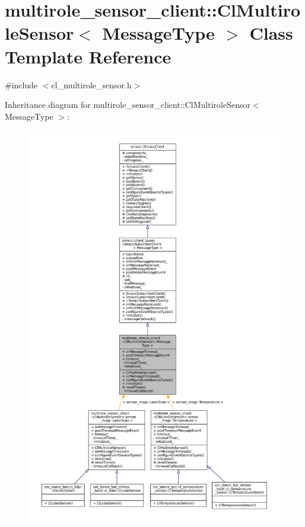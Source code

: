 \hypertarget{classmultirole__sensor__client_1_1ClMultiroleSensor}{}\section{multirole\+\_\+sensor\+\_\+client\+:\+:Cl\+Multirole\+Sensor$<$ Message\+Type $>$ Class Template Reference}
\label{classmultirole__sensor__client_1_1ClMultiroleSensor}


{\ttfamily \#include $<$cl\+\_\+multirole\+\_\+sensor.\+h$>$}



Inheritance diagram for multirole\+\_\+sensor\+\_\+client\+:\+:Cl\+Multirole\+Sensor$<$ Message\+Type $>$\+:
\nopagebreak
\begin{figure}[H]
\begin{center}
\leavevmode
\includegraphics[width=350pt]{classmultirole__sensor__client_1_1ClMultiroleSensor__inherit__graph}
\end{center}
\end{figure}


